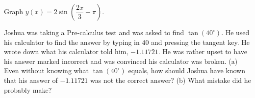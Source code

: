\documentclass[lang=en,11pt]{elegantbook}
\begin{document}
\begin{reviewset}
\item Graph $y(x)=2\sin\left(\dfrac{2x}{3}-\pi\right)$. \vspace{3mm}
\item Joshua was taking a Pre-calculus test and was asked to find $\tan(40^{\circ})$. He used his calculator to find the answer by typing in $40$ and pressing the tangent key. He wrote down what his calculator told him, $-1.11721$. He was rather upset to have his answer marked incorrect and was convinced his calculator was broken. \newline 
(a) Even without knowing what $\tan(40^{\circ})$ equals, how should Joshua have known that his answer of $-1.11721$ was not the correct answer? \newline 
(b) What mistake did he probably make? \vspace{3mm}
\end{reviewset}
\end{document}
